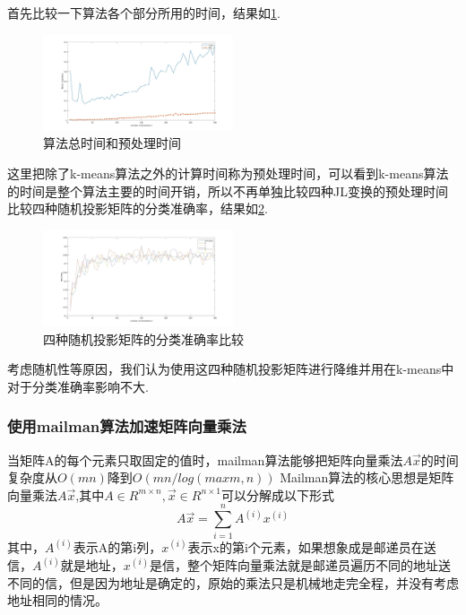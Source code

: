 \documentclass{ctexart}
\begin{document}
    首先比较一下算法各个部分所用的时间，结果如\ref{time4}.
    \begin{figure}[h]
        \centering
        \includegraphics[width=0.50\textwidth]{result/total_pre.jpg}
        \caption{算法总时间和预处理时间}
        \label{time4}
    \end{figure}

    这里把除了k-means算法之外的计算时间称为预处理时间，可以看到k-means算法的时间是整个算法主要的时间开销，所以不再单独比较四种JL变换的预处理时间\\

    比较四种随机投影矩阵的分类准确率，结果如\ref{accu4}.
    \begin{figure}[h]
        \centering
        \includegraphics[width=0.50\textwidth]{result/accu.jpg}
        \caption{四种随机投影矩阵的分类准确率比较}
        \label{accu4}
    \end{figure}

    考虑随机性等原因，我们认为使用这四种随机投影矩阵进行降维并用在k-means中对于分类准确率影响不大.\\

    \subsubsection{使用mailman算法加速矩阵向量乘法}
    当矩阵A的每个元素只取固定的值时，mailman算法能够把矩阵向量乘法$A\vec{x}$的时间复杂度从$O(mn)$降到$O(mn/log(max{m,n}))$
    Mailman算法的核心思想是矩阵向量乘法$A\vec{x}$,其中$A \in R^{m \times n}, \vec{x}\in R^{n \times 1}$可以分解成以下形式\\
    \begin{equation*}
    A\vec{x} = \sum_{i=1}^n A^{(i)}x^{(i)}
    \end{equation*}
    其中，$A^{(i)}$表示A的第i列，$x^{(i)}$表示x的第i个元素，如果想象成是邮递员在送信，$A^{(i)}$就是地址，$x^{(i)}$是信，整个矩阵向量乘法就是邮递员遍历不同的地址送不同的信，但是因为地址是确定的，原始的乘法只是机械地走完全程，并没有考虑地址相同的情况。\\
\end{document}
